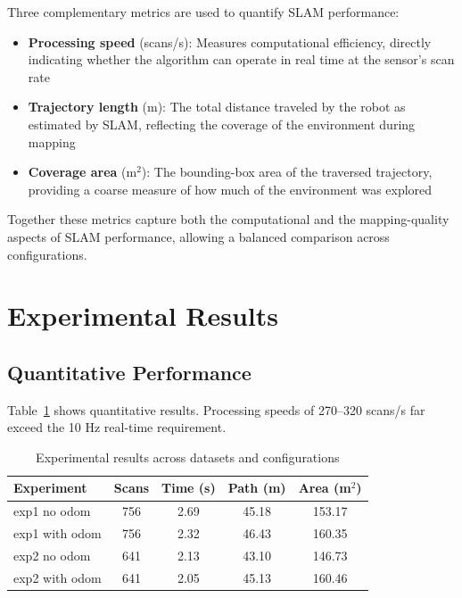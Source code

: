 \documentclass[conference]{IEEEtran}
\begin{document}
  Three complementary metrics are used to quantify SLAM performance:

  \begin{itemize}
      \item \textbf{Processing speed} (scans/s): Measures computational efficiency, directly indicating
  whether the algorithm can operate in real time at the sensor's scan rate
      \item \textbf{Trajectory length} (m): The total distance traveled by the robot as estimated by SLAM,
  reflecting the coverage of the environment during mapping
      \item \textbf{Coverage area} (m$^2$): The bounding-box area of the traversed trajectory, providing a
  coarse measure of how much of the environment was explored
  \end{itemize}

  Together these metrics capture both the computational and the mapping-quality aspects of SLAM
  performance, allowing a balanced comparison across configurations.

  \section{Experimental Results}

  \subsection{Quantitative Performance}

  Table~\ref{tab:results} shows quantitative results. Processing speeds of 270--320 scans/s far exceed the
  10 Hz real-time requirement.

  \begin{table}[h]
  \centering
  \caption{Experimental results across datasets and configurations}
  \label{tab:results}
  \small
  \begin{tabular}{lcccc}
  \toprule
  \textbf{Experiment} & \textbf{Scans} & \textbf{Time (s)} & \textbf{Path (m)} & \textbf{Area (m$^2$)} \\
  \midrule
  exp1 no odom & 756 & 2.69 & 45.18 & 153.17 \\
  exp1 with odom & 756 & 2.32 & 46.43 & 160.35 \\
  exp2 no odom & 641 & 2.13 & 43.10 & 146.73 \\
  exp2 with odom & 641 & 2.05 & 45.13 & 160.46 \\
  \bottomrule
  \end{tabular}
  \end{table}
\end{document}
